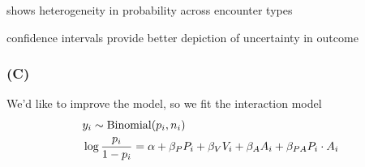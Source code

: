 \documentclass{article}
\begin{document}
shows heterogeneity in probability across encounter types

confidence intervals provide better depiction of uncertainty in outcome



\subsubsection*{(C)}

We'd like to improve the model, so we  fit the interaction model 
\begin{align*}
&y_i \sim {\rm Binomial} ( p_i , n_i)\\
&\log \frac{p_i}{1-p_i} = \alpha + \beta_P P_i + \beta_V V_i + \beta_A A_i + \beta_{PA} P_i \cdot A_i
\end{align*}
\end{document}
